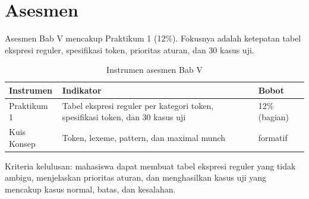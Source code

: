 \section*{Asesmen}

Asesmen Bab V mencakup Praktikum 1 (12\%). Fokusnya adalah ketepatan
tabel ekspresi reguler, spesifikasi token, prioritas aturan, dan 30
kasus uji.

\begin{table}[H]
\centering
\caption{Instrumen asesmen Bab V}
\label{tab:ch05-asesmen}
\begin{tabularx}{\textwidth}{@{}lXl@{}}
\toprule
\textbf{Instrumen} & \textbf{Indikator} & \textbf{Bobot} \\
\midrule
Praktikum 1 & Tabel ekspresi reguler per kategori token, spesifikasi
token, dan 30 kasus uji & 12\% (bagian) \\
Kuis Konsep & Token, lexeme, pattern, dan maximal munch &
formatif \\
\bottomrule
\end{tabularx}
\end{table}

Kriteria kelulusan: mahasiswa dapat membuat tabel ekspresi reguler
yang tidak ambigu, menjelaskan prioritas aturan, dan menghasilkan
kasus uji yang mencakup kasus normal, batas, dan kesalahan.
